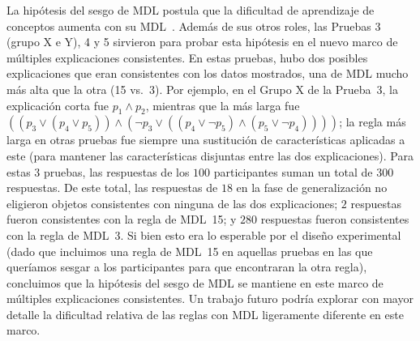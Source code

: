 La hipótesis del sesgo de MDL postula que la dificultad de aprendizaje de conceptos aumenta con su MDL~\cite{feldman2000minimization}. Además de sus otros roles, las Pruebas 3 (grupo X e Y), 4 y 5 sirvieron para probar esta hipótesis en el nuevo marco de múltiples explicaciones consistentes. En estas pruebas, hubo dos posibles explicaciones que eran consistentes con los datos mostrados, una de MDL mucho más alta que la otra (15 vs.\ 3). Por ejemplo, en el Grupo X de la Prueba~3, la explicación corta fue $ p_1 \land p_2 $, mientras que la más larga fue $ ((p_3 \lor (p_4 \lor p_5)) \land (\lnot p_3 \lor ( (p_4 \lor \lnot p_5) \land (p_5 \lor \lnot p_4)))) $; la regla más larga en otras pruebas fue siempre una sustitución de características aplicadas a este (para mantener las características disjuntas entre las dos explicaciones). Para estas 3 pruebas, las respuestas de los $ 100 $ participantes suman un total de $ 300 $ respuestas. De este total, las respuestas de $ 18 $ en la fase de generalización no eligieron objetos consistentes con ninguna de las dos explicaciones; $ 2 $ respuestas fueron consistentes con la regla de MDL~15; y $ 280 $ respuestas fueron consistentes con la regla de MDL~3. Si bien esto era lo esperable por el diseño experimental (dado que incluimos una regla de MDL~15 en aquellas pruebas en las que queríamos sesgar a los participantes para que encontraran la otra regla), concluimos que la hipótesis del sesgo de MDL se mantiene en este marco de múltiples explicaciones consistentes. Un trabajo futuro podría explorar con mayor detalle la dificultad relativa de las reglas con MDL ligeramente diferente en este marco.



